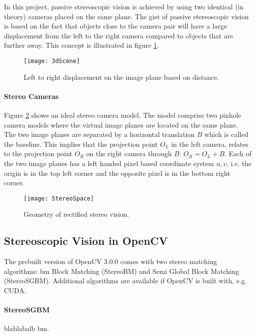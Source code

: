 In this project, passive stereoscopic vision is achieved by using two identical (in theory) cameras placed on the same plane. The gist of passive stereoscopic vision is based on the fact that objects close to the camera pair will have a large displacement from the left to the right camera compared to objects that are further away. This concept is illustrated in figure \ref{fig:3dScene}.

\begin{figure}
\centering
\texttt{[image: 3dScene]}
\caption{\label{fig:3dScene}Left to right displacement on the image plane based on distance.}
\end{figure} 

\paragraph{Stereo Cameras}

Figure \ref{fig:StereoSpace} shows an ideal stereo camera model.  The model comprise two pinhole camera models where the virtual image planes are located on the same plane. The two image planes are separated by a horizontal translation $B$ which is called the baseline. This implies that the projection point $O_L$  in the left camera, relates to the projection point $O_R$ on the right camera through $B$: $O_R = O_L + B$. Each of the two image planes has a left handed pixel based coordinate system $u,v$, i.e. the origin is in the top left corner and the opposite pixel is in the bottom right corner. 

\begin{figure}
\centering
\texttt{[image: StereoSpace]}
\caption{\label{fig:StereoSpace}Geometry of rectified stereo vision.}
\end{figure}

\subsection{Stereoscopic Vision in OpenCV}

The prebuilt version of OpenCV 3.0.0 comes with two stereo matching algorithms: \gls{bm} Block Matching (StereoBM) and Semi Global Block Matching (StereoSGBM). Additional algorithms are available if OpenCV is built with, e.g. CUDA.

\paragraph{StereoSGBM}\cite{hirschmullerstereo}
blablabalb \gls{bm}.
